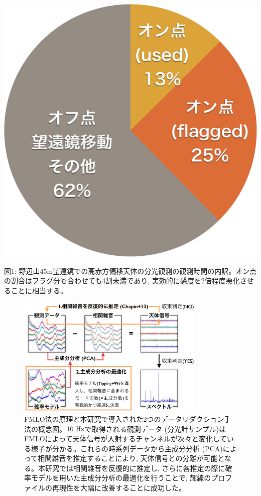 \documentclass[a4paper,10pt,oneside,twocolumn,notitlepage,final]{jarticle}
\begin{document}
\vspace{2mm}
\begin{minipage}{0.2\textwidth}
    \includegraphics[width=\textwidth]{fig/obstime.pdf}
\end{minipage}
\hfill
\begin{minipage}{0.23\textwidth}
    \small{図1: 野辺山45m望遠鏡での高赤方偏移天体の分光観測の観測時間の内訳。オン点の割合はフラグ分も合わせても4割未満であり, 実効的に感度を2倍程度悪化させることに相当する。}
\end{minipage}
\vspace{2mm}
\setcounter{figure}{1}
\begin{figure}[!t]
    \centering
    \includegraphics[width=0.8\textwidth]{fig/fmlo.pdf}
    \caption{FMLO法の原理と本研究で導入された2つのデータリダクション手法の概念図。$10\,\,\mathrm{Hz}$で取得される観測データ (分光計サンプル)はFMLOによって天体信号が入射するチャンネルが次々と変化している様子が分かる。これらの時系列データから主成分分析 (PCA)によって相関雑音を推定することにより, 天体信号との分離が可能となる。本研究では相関雑音を反復的に推定し, さらに各推定の際に確率モデルを用いた主成分分析の最適化を行うことで, 輝線のプロファイルの再現性を大幅に改善することに成功した。}
    \label{fmlo}
\end{figure}
\end{document}
